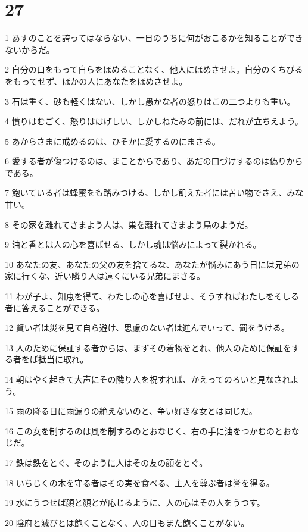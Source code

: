 \chapter{27}

\par 1 あすのことを誇ってはならない、一日のうちに何がおこるかを知ることができないからだ。
\par 2 自分の口をもって自らをほめることなく、他人にほめさせよ。自分のくちびるをもってせず、ほかの人にあなたをほめさせよ。
\par 3 石は重く、砂も軽くはない、しかし愚かな者の怒りはこの二つよりも重い。
\par 4 憤りはむごく、怒りははげしい、しかしねたみの前には、だれが立ちえよう。
\par 5 あからさまに戒めるのは、ひそかに愛するのにまさる。
\par 6 愛する者が傷つけるのは、まことからであり、あだの口づけするのは偽りからである。
\par 7 飽いている者は蜂蜜をも踏みつける、しかし飢えた者には苦い物でさえ、みな甘い。
\par 8 その家を離れてさまよう人は、巣を離れてさまよう鳥のようだ。
\par 9 油と香とは人の心を喜ばせる、しかし魂は悩みによって裂かれる。
\par 10 あなたの友、あなたの父の友を捨てるな、あなたが悩みにあう日には兄弟の家に行くな、近い隣り人は遠くにいる兄弟にまさる。
\par 11 わが子よ、知恵を得て、わたしの心を喜ばせよ、そうすればわたしをそしる者に答えることができる。
\par 12 賢い者は災を見て自ら避け、思慮のない者は進んでいって、罰をうける。
\par 13 人のために保証する者からは、まずその着物をとれ、他人のために保証をする者をば抵当に取れ。
\par 14 朝はやく起きて大声にその隣り人を祝すれば、かえってのろいと見なされよう。
\par 15 雨の降る日に雨漏りの絶えないのと、争い好きな女とは同じだ。
\par 16 この女を制するのは風を制するのとおなじく、右の手に油をつかむのとおなじだ。
\par 17 鉄は鉄をとぐ、そのように人はその友の顔をとぐ。
\par 18 いちじくの木を守る者はその実を食べる、主人を尊ぶ者は誉を得る。
\par 19 水にうつせば顔と顔とが応じるように、人の心はその人をうつす。
\par 20 陰府と滅びとは飽くことなく、人の目もまた飽くことがない。
